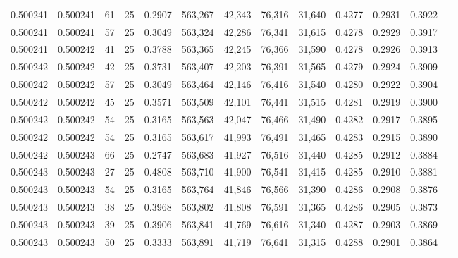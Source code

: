 \begin{tabular}{rrrrrrrrrrrrr}
0.500241 & 0.500241 &    61 &  25 &                                     0.2907 & 563,267 &  42,343 &  76,316 &  31,640 & 0.4277 & 0.2931 & 0.3922 \\
0.500241 & 0.500241 &    57 &  25 &                                     0.3049 & 563,324 &  42,286 &  76,341 &  31,615 & 0.4278 & 0.2929 & 0.3917 \\
0.500241 & 0.500242 &    41 &  25 &                                     0.3788 & 563,365 &  42,245 &  76,366 &  31,590 & 0.4278 & 0.2926 & 0.3913 \\
0.500242 & 0.500242 &    42 &  25 &                                     0.3731 & 563,407 &  42,203 &  76,391 &  31,565 & 0.4279 & 0.2924 & 0.3909 \\
0.500242 & 0.500242 &    57 &  25 &                                     0.3049 & 563,464 &  42,146 &  76,416 &  31,540 & 0.4280 & 0.2922 & 0.3904 \\
0.500242 & 0.500242 &    45 &  25 &                                     0.3571 & 563,509 &  42,101 &  76,441 &  31,515 & 0.4281 & 0.2919 & 0.3900 \\
0.500242 & 0.500242 &    54 &  25 &                                     0.3165 & 563,563 &  42,047 &  76,466 &  31,490 & 0.4282 & 0.2917 & 0.3895 \\
0.500242 & 0.500242 &    54 &  25 &                                     0.3165 & 563,617 &  41,993 &  76,491 &  31,465 & 0.4283 & 0.2915 & 0.3890 \\
0.500242 & 0.500243 &    66 &  25 &                                     0.2747 & 563,683 &  41,927 &  76,516 &  31,440 & 0.4285 & 0.2912 & 0.3884 \\
0.500243 & 0.500243 &    27 &  25 &                                     0.4808 & 563,710 &  41,900 &  76,541 &  31,415 & 0.4285 & 0.2910 & 0.3881 \\
0.500243 & 0.500243 &    54 &  25 &                                     0.3165 & 563,764 &  41,846 &  76,566 &  31,390 & 0.4286 & 0.2908 & 0.3876 \\
0.500243 & 0.500243 &    38 &  25 &                                     0.3968 & 563,802 &  41,808 &  76,591 &  31,365 & 0.4286 & 0.2905 & 0.3873 \\
0.500243 & 0.500243 &    39 &  25 &                                     0.3906 & 563,841 &  41,769 &  76,616 &  31,340 & 0.4287 & 0.2903 & 0.3869 \\
0.500243 & 0.500243 &    50 &  25 &                                     0.3333 & 563,891 &  41,719 &  76,641 &  31,315 & 0.4288 & 0.2901 & 0.3864 \\

\end{tabular}
